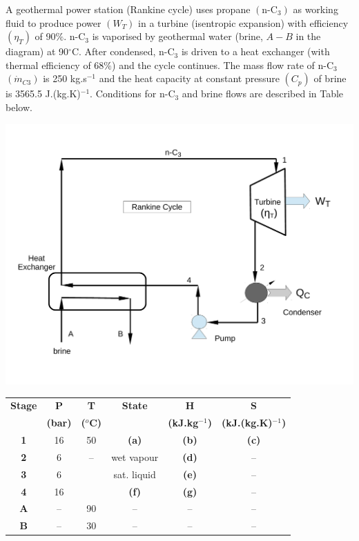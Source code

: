 \documentclass[calculator,steamtables,allquestions,datasheet,resit,solutions]{exam_newMarcus2}
\begin{document}
\begin{question}
%
A geothermal power station (Rankine cycle) uses propane $\left(\text{n-C}_{3}\right)$ as working fluid to produce power $\left(W_{T}\right)$ in a turbine (isentropic expansion) with efficiency $\left(\eta_{T}\right)$ of 90$\%$. n-C$_{3}$ is vaporised by geothermal water (brine, $A-B$ in the diagram) at 90$^{\circ}$C. After condensed, n-C$_{3}$ is driven to a heat exchanger (with thermal efficiency of 68$\%$) and the cycle continues. The mass flow rate of n-C$_{3}$ $\left(\dot{m}_{C3}\right)$ is 250 kg.s$^{-1}$ and the heat capacity at constant pressure $\left(C_{p}\right)$ of brine is 3565.5 J.(kg.K)$^{-1}$. Conditions for n-C$_{3}$ and brine flows are described in Table below.
\begin{center}
\includegraphics[width=10.cm,height=7.cm,clip]{./Pics/RankineCycle}
\end{center}
\begin{center}
\begin{tabular} {||c | c c c c c || }
\hline\hline
{\bf Stage} & {\bf P}    & {\bf T}        & {\bf State}    & {\bf H}             & {\bf S}                  \\
            & {\bf (bar)}& {\bf ($^{o}$C)} &               & {\bf (kJ.kg$^{-1}$)} & {\bf (kJ.(kg.K)$^{-1}$)}  \\
\hline\hline
 {\bf 1 }   & 16         & 50             &   {\bf (a)}    & {\bf (b)}           & {\bf (c)}                \\
 {\bf 2 }   & 6          &  --            &   wet vapour   & {\bf (d)}           & --                       \\
 {\bf 3 }   & 6          &                &   sat. liquid  & {\bf (e)}           & --                       \\
 {\bf 4 }   & 16         &                &   {\bf (f)}    & {\bf (g)}           & --                       \\
 {\bf A }   & --         & 90             &   --           & --                  & --                       \\
 {\bf B }   & --         & 30             &   --           & --                  & --                       \\
 \hline\hline
\end{tabular}
\end{center}


\end{question}
\end{document}
